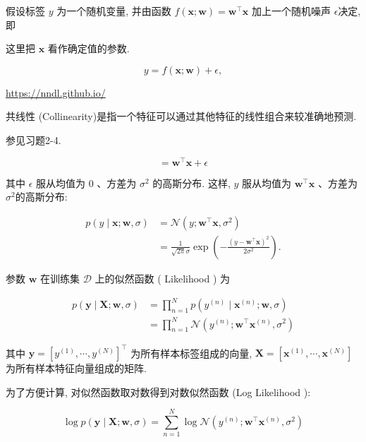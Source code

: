 \documentclass[10pt]{article}
\begin{document}
假设标签 $y$ 为一个随机变量, 并由函数 $f(\boldsymbol{x} ; \boldsymbol{w})=\boldsymbol{w}^{\top} \boldsymbol{x}$ 加上一个随机噪声 $\epsilon$决定,即

这里把 $\boldsymbol{x}$ 看作确定值的参数.


\begin{equation*}
y=f(\boldsymbol{x} ; \boldsymbol{w})+\epsilon, \tag{2.45}
\end{equation*}


\href{https://nndl.github.io/}{https://nndl.github.io/}

共线性 (Collinearity)是指一个特征可以通过其他特征的线性组合来较准确地预测.

参见习题2-4.


\begin{equation*}
=\boldsymbol{w}^{\top} \boldsymbol{x}+\epsilon \tag{2.46}
\end{equation*}


其中 $\epsilon$ 服从均值为 0 、方差为 $\sigma^{2}$ 的高斯分布. 这样, $y$ 服从均值为 $\boldsymbol{w}^{\top} \boldsymbol{x}$ 、方差为 $\sigma^{2}$的高斯分布:


\begin{align*}
p(y \mid \boldsymbol{x} ; \boldsymbol{w}, \sigma) & =\mathcal{N}\left(y ; \boldsymbol{w}^{\top} \boldsymbol{x}, \sigma^{2}\right)  \tag{2.47}\\
& =\frac{1}{\sqrt{2 \pi} \sigma} \exp \left(-\frac{\left(y-\boldsymbol{w}^{\top} \boldsymbol{x}\right)^{2}}{2 \sigma^{2}}\right) . \tag{2.48}
\end{align*}


参数 $\boldsymbol{w}$ 在训练集 $\mathcal{D}$ 上的似然函数 ( Likelihood ) 为


\begin{align*}
p(\boldsymbol{y} \mid \boldsymbol{X} ; \boldsymbol{w}, \sigma) & =\prod_{n=1}^{N} p\left(y^{(n)} \mid \boldsymbol{x}^{(n)} ; \boldsymbol{w}, \sigma\right)  \tag{2.49}\\
& =\prod_{n=1}^{N} \mathcal{N}\left(y^{(n)} ; \boldsymbol{w}^{\top} \boldsymbol{x}^{(n)}, \sigma^{2}\right) \tag{2.50}
\end{align*}


其中 $\boldsymbol{y}=\left[y^{(1)}, \cdots, y^{(N)}\right]^{\top}$ 为所有样本标签组成的向量, $\boldsymbol{X}=\left[\boldsymbol{x}^{(1)}, \cdots, \boldsymbol{x}^{(N)}\right]$ 为所有样本特征向量组成的矩阵.

为了方便计算, 对似然函数取对数得到对数似然函数 (Log Likelihood ):


\begin{equation*}
\log p(\boldsymbol{y} \mid \boldsymbol{X} ; \boldsymbol{w}, \sigma)=\sum_{n=1}^{N} \log \mathcal{N}\left(y^{(n)} ; \boldsymbol{w}^{\top} \boldsymbol{x}^{(n)}, \sigma^{2}\right) \tag{2.51}
\end{equation*}
\end{document}
